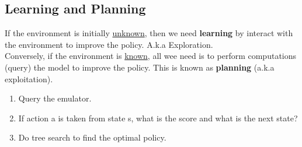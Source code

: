 	 \subsection{Learning and Planning}
	 If the environment is initially \underline{unknown}, then we need \textbf{learning} by interact with the environment to improve the policy. A.k.a Exploration.\\ 
	 Conversely, if the environment is \underline{known}, all wee need is to perform computations (query) the model to improve the policy. This is known as \textbf{planning} (a.k.a exploitation). 
	 \begin{enumerate}
	 \item Query the emulator.
	 \item If action a is taken from state s, what is the score and what is the next state? 
	 \item Do tree search to find the optimal policy.
	 \end{enumerate}